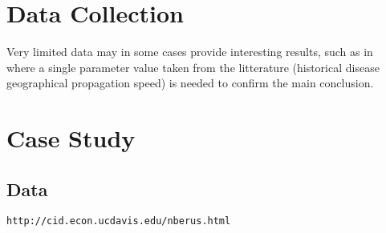 \documentclass[11pt]{article}
\begin{document}
\section{Data Collection}

Very limited data may in some cases provide interesting results, such as in~\cite{2013arXiv1310.2636M} where a single parameter value taken from the litterature (historical disease geographical propagation speed) is needed to confirm the main conclusion.

\section{Case Study}

\subsection{Data}


\texttt{http://cid.econ.ucdavis.edu/nberus.html}











\end{document}
